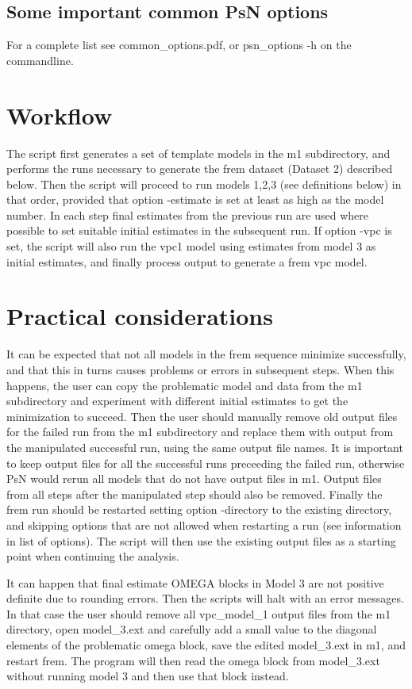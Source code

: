 \subsection{Some important common PsN options}
For a complete list see common\_options.pdf, 
or psn\_options -h on the commandline.



\section{Workflow}
The script first generates a set of template models in the m1 subdirectory, and performs the runs necessary to generate
the frem dataset (Dataset 2) described below. Then the script will proceed to run models 1,2,3 (see definitions below) 
in that order, provided
that option -estimate is set at least as high as the model number. In each step final estimates from the previous run are
used where possible to set suitable initial estimates in the subsequent run. If option -vpc is set, the script will also 
run the vpc1 model using estimates from model 3 as initial estimates, and finally process output to generate a frem vpc model.

\section{Practical considerations}
It can be expected that not all models in the frem sequence minimize successfully, and that this in turns 
causes problems or errors in subsequent steps. 
When this happens, the user can copy the problematic model and data from the m1 subdirectory and experiment with
different initial estimates to get the minimization to succeed. Then the user should manually remove old output files for the
failed run from the m1 subdirectory and replace them with output from the manipulated successful run, using the same 
output file names. It is important to keep output files for all the successful runs preceeding the failed run, 
otherwise PsN would rerun all models that do not have output files
in m1. Output files from all steps after the manipulated step should also be removed.
Finally the frem run should be restarted setting option -directory to the existing directory, and skipping 
options that are not allowed when restarting a run (see information in list of options). The script
will then use the existing output files as a starting point when continuing the analysis.

It can happen that final estimate OMEGA blocks in Model 3 are not positive definite due to rounding errors. Then the scripts
will halt with an error messages. In that case the user should remove all vpc\_model\_1 output files from
the m1 directory, open model\_3.ext and carefully add a small value to the diagonal elements of the problematic omega block,
save the edited model\_3.ext in m1, and restart frem. The program will then read the omega block from model\_3.ext
without running model 3 and then use that block instead.

